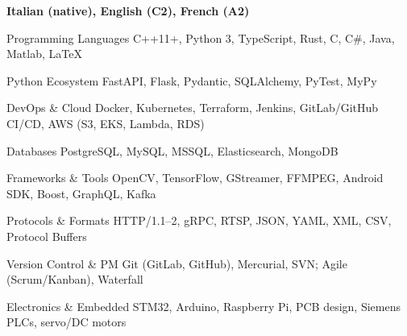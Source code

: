 \begin{cvskills}
    \cvskill
    {} 
    {\textbf{Italian (native), English (C2), French (A2)}} 
\end{cvskills}


\begin{cvskills}

\cvskill
    {Programming Languages}
    {C++11+, Python 3, TypeScript, Rust, C, C\#, Java, Matlab, \LaTeX}

\cvskill
    {Python Ecosystem}
    {FastAPI, Flask, Pydantic, SQLAlchemy, PyTest, MyPy}

\cvskill
    {DevOps \& Cloud}
    {Docker, Kubernetes, Terraform, Jenkins, GitLab/GitHub CI/CD, AWS (S3, EKS, Lambda, RDS)}

\cvskill
    {Databases}
    {PostgreSQL, MySQL, MSSQL, Elasticsearch, MongoDB}

\cvskill
    {Frameworks \& Tools}
    {OpenCV, TensorFlow, GStreamer, FFMPEG, Android SDK, Boost, GraphQL, Kafka}

\cvskill
    {Protocols \& Formats}
    {HTTP/1.1–2, gRPC, RTSP, JSON, YAML, XML, CSV, Protocol Buffers}

\cvskill
    {Version Control \& PM}
    {Git (GitLab, GitHub), Mercurial, SVN; Agile (Scrum/Kanban), Waterfall}

\cvskill
    {Electronics \& Embedded}
    {STM32, Arduino, Raspberry Pi, PCB design, Siemens PLCs, servo/DC motors}

\end{cvskills}
